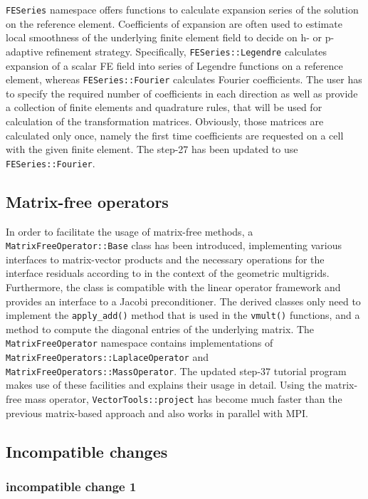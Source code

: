 \documentclass{ansarticle-preprint}
\begin{document}
\verb|FESeries| namespace offers functions to calculate expansion series of the solution on the reference element.
Coefficients of expansion are often used to estimate local smoothness of the underlying finite element field to decide on h- or p-adaptive refinement strategy. Specifically, \verb|FESeries::Legendre| calculates expansion of a scalar FE field into series of Legendre functions on a reference element, whereas \verb|FESeries::Fourier| calculates Fourier coefficients. The user has to specify the required number of coefficients in each direction as well as provide a collection of finite elements and quadrature rules, that will be used for calculation of the transformation matrices. Obviously, those matrices are calculated only once, namely the first time coefficients are requested on a cell with the given finite element.
The step-27 has been updated to use \verb|FESeries::Fourier|.

\subsection{Matrix-free operators}

In order to facilitate the usage of matrix-free methods, a \verb!MatrixFreeOperator::Base! class has been introduced,
implementing various interfaces to matrix-vector products and the necessary operations for the interface residuals according to \cite{JanssenKanschat2011} in
the context of the geometric multigrids. Furthermore, the class is compatible with the linear operator framework and provides an interface to a Jacobi preconditioner.
The derived classes only need to implement the \verb!apply_add()! method that is
used in the \verb!vmult()! functions, and a method to compute the diagonal entries of the underlying matrix.
The \verb!MatrixFreeOperator! namespace contains implementations of \verb!MatrixFreeOperators::LaplaceOperator! and
\verb!MatrixFreeOperators::MassOperator!.
The updated step-37 tutorial program makes use of these facilities and
explains their usage in detail. Using the matrix-free mass operator,
\verb!VectorTools::project! has become much faster than the previous
matrix-based approach and also works in parallel with MPI.

\subsection{Incompatible changes}

\subsubsection{incompatible change 1}
\end{document}
